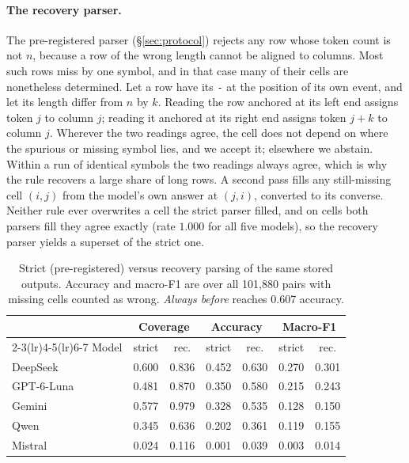 \documentclass[11pt]{article}
\newcommand{\Ds}{DeepSeek}
\newcommand{\Gp}{GPT-6-Luna}
\newcommand{\Gm}{Gemini}
\newcommand{\Qw}{Qwen}
\newcommand{\Ms}{Mistral}
\begin{document}
\paragraph{The recovery parser.}
The pre-registered parser (\S\ref{sec:protocol}) rejects any row whose token count is not $n$,
because a row of the wrong length cannot be aligned to columns. Most such rows miss by one
symbol, and in that case many of their cells are nonetheless determined. Let a row have its
\texttt{-} at the position of its own event, and let its length differ from $n$ by $k$. Reading
the row anchored at its left end assigns token $j$ to column $j$; reading it anchored at its
right end assigns token $j+k$ to column $j$. Wherever the two readings agree, the cell does not
depend on where the spurious or missing symbol lies, and we accept it; elsewhere we abstain.
Within a run of identical symbols the two readings always agree, which is why the rule recovers
a large share of long rows. A second pass fills any still-missing cell $(i,j)$ from the model's
own answer at $(j,i)$, converted to its converse. Neither rule ever overwrites a cell the strict
parser filled, and on cells both parsers fill they agree exactly (rate $1.000$ for all five
models), so the recovery parser yields a superset of the strict one.

\begin{table}[!ht]
\centering
\small
\setlength{\tabcolsep}{3.0pt}
\begin{tabular}{l cc cc cc}
\toprule
& \multicolumn{2}{c}{Coverage} & \multicolumn{2}{c}{Accuracy} & \multicolumn{2}{c}{Macro-F1} \\
\cmidrule(lr){2-3}\cmidrule(lr){4-5}\cmidrule(lr){6-7}
Model & strict & rec. & strict & rec. & strict & rec. \\
\midrule
\Ds & 0.600 & 0.836 & 0.452 & 0.630 & 0.270 & 0.301 \\
\Gp & 0.481 & 0.870 & 0.350 & 0.580 & 0.215 & 0.243 \\
\Gm & 0.577 & 0.979 & 0.328 & 0.535 & 0.128 & 0.150 \\
\Qw & 0.345 & 0.636 & 0.202 & 0.361 & 0.119 & 0.155 \\
\Ms & 0.024 & 0.116 & 0.001 & 0.039 & 0.003 & 0.014 \\
\bottomrule
\end{tabular}
\caption{Strict (pre-registered) versus recovery parsing of the same stored outputs. Accuracy
and macro-F1 are over all 101,880 pairs with missing cells counted as wrong. \emph{Always before}
reaches 0.607 accuracy.}
\label{tab:recovery}
\end{table}
\end{document}

